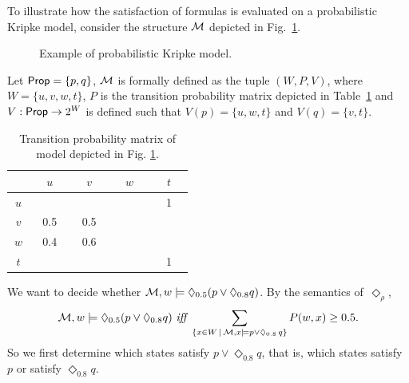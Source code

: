 \begin{example}\label{ex1}
To illustrate how the satisfaction of formulas is evaluated on a probabilistic Kripke model, consider the structure $\mathcal{M}$ depicted in Fig.~\ref{fig:classic}.

\begin{figure}[!ht]
    \centering
    \caption{Example of probabilistic Kripke model.}
    \label{fig:classic}
\end{figure}

Let $\mathsf{Prop}=\{p,q\}$, $\mathcal{M}$ is formally defined as the tuple $(W,P,V)$, where $W=\{u,v,w,t\}$, $P$ is the transition probability matrix depicted in Table~\ref{prob_matrix} and $V: \mathsf{Prop}\rightarrow 2^W$ is defined such that $V(p)=\{u,w,t\}$ and $V(q)=\{v,t\}$.

\begin{table}[!ht]
    \centering
        \caption{Transition probability matrix of model depicted in Fig. \ref{fig:classic}.}
    \begin{tabular}{|c|c c c c|}
        \hline
         &$\quad u\quad$&$\quad v\quad$&$\quad w\quad$&$\quad t\quad$ \\\hline
         $\>u\>$&&&&1\\
         $v$&0.5 & 0.5&$\quad$&\\
         $w$& 0.4&0.6&&\\
         $t$& &&&1\\ \hline
    \end{tabular}
    \label{prob_matrix}
\end{table}

We want to decide whether $\mathcal{M},w \models \Diamond_{0.5}(p \vee \Diamond_{0.8} q)$.
By the semantics of~$\Diamond_\rho$,
\[
\M,w \models \Diamond_{0.5}(p \vee \Diamond_{0.8} q)
\ \iff \ 
\sum_{\{x\in W \,\mid\, \M,x\models p \vee \Diamond_{0.8}\, q\}} P(w,x) \geq 0.5 .
\]
So we first determine which states satisfy $p \vee \Diamond_{0.8} q$, that is,
which states satisfy $p$ or satisfy $\Diamond_{0.8} q$.


\end{example}
